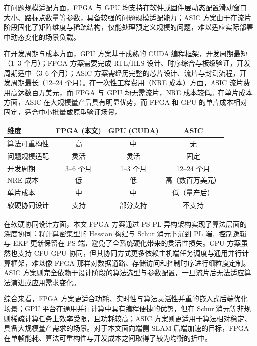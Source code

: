 在问题规模适配方面，FPGA 与 GPU 均支持在软件或固件层动态配置滑动窗口大小、路标点数量等参数，具备较强的问题规模适配能力；ASIC 方案由于在流片阶段固化了矩阵维度与稀疏结构，仅能处理预定义规模的问题，难以适应实际部署中动态变化的场景负载。

在开发周期与成本方面，GPU 方案基于成熟的 CUDA 编程框架，开发周期最短（1--3 个月）；FPGA 方案需要完成 RTL/HLS 设计、时序综合与板级验证，开发周期适中（3--6 个月）；ASIC 方案需经历完整的芯片设计、流片与封测流程，开发周期最长（12--24 个月）。在一次性工程费用（NRE 成本）方面，ASIC 流片费用高达数百万美元，而 FPGA 与 GPU 均无需流片，NRE 成本较低。在单片成本方面，ASIC 在大规模量产后具有明显优势，而 FPGA 和 GPU 的单片成本相对固定，适合中小批量或原型验证场景。

\begin{table}[h!t]
\centering
{}
\label{tab:flexibility_comparison}
\scriptsize
\begin{tabular}{lccc}
\toprule
维度 & FPGA (本文) & GPU (CUDA) & ASIC\cite{Li2024SLAMCIM} \\
\midrule
算法可重构性 & 高 & 中 & 无 \\
问题规模适配 & 灵活 & 灵活 & 固定 \\
开发周期 & 3--6 个月 & 1--3 个月 & 12--24 个月 \\
NRE 成本 & 低 & 低 & 高（数百万美元） \\
单片成本 & 中 & 中 & 低（量产后） \\
软硬协同设计 & 支持 & 部分支持 & 不支持 \\
\bottomrule
\end{tabular}
\end{table}

在软硬协同设计方面，本文 FPGA 方案通过 PS-PL 异构架构实现了算法层面的深度协同：将计算密集型的 Hessian 构建与 Schur 消元下沉到 PL 端，控制逻辑与 EKF 更新保留在 PS 端，避免了全系统硬化带来的灵活性损失。GPU 方案虽然也支持 CPU-GPU 协同，但其协同方式更多依赖主机端任务调度与通用并行计算框架，难以像 FPGA 那样对数据通路、存储访问和控制时序进行细粒度定制。ASIC 方案则完全依赖于设计阶段的算法选型与参数配置，一旦流片后无法适应算法演进或应用需求变化。

综合来看，FPGA 方案更适合功耗、实时性与算法灵活性并重的嵌入式后端优化场景；GPU 平台在通用并行计算中具有编程便捷的优势，但在 Schur 消元等非规则稀疏计算任务上效率受限，且功耗较高；ASIC 方案则更适用于算法相对稳定、具备大规模量产需求的场景。对于本文面向端侧 SLAM 后端加速的目标，FPGA 在单帧能耗、算法可重构性与开发成本之间取得了较为均衡的折中。

